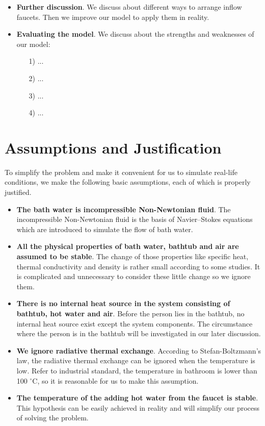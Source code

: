 \documentclass{mcmthesis}
\begin{document}
\begin{itemize}
\item {\bf Further discussion}. We discuss about different ways to arrange inflow 
faucets. Then we improve our model to apply them in reality.

\item {\bf Evaluating the model}. We discuss about the strengths and weaknesses 
of our model:

\begin{itemize}
\item[1)] ... 
\item[2)] ...
\item[3)] ...
\item[4)] ...
\end{itemize}

\end{itemize}

\section{Assumptions and Justification}

To simplify the problem and make it convenient for us to simulate real-life 
conditions, we make the following basic assumptions, each of which is properly 
justified.

\begin{itemize}
\item {\bf The bath water is incompressible Non-Newtonian fluid}. The 
incompressible Non-Newtonian fluid is the basis of Navier–Stokes equations 
which are introduced to simulate the flow of bath water.

\item {\bf All the physical properties of bath water, bathtub and air are 
assumed to be stable}. The change of those properties like specific heat, 
thermal conductivity and density is rather small according to some 
studies. It is complicated and unnecessary to consider these little 
change so we ignore them.

\item {\bf There is no internal heat source in the system consisting of bathtub, 
hot water and air}. Before the person lies in the bathtub, no internal heat source 
exist except the system components. The circumstance where the person is in the 
bathtub will be investigated in our later discussion.

\item {\bf We ignore radiative thermal exchange}. According to Stefan-Boltzmann’s 
law, the radiative thermal exchange can be ignored when the temperature is low. 
Refer to industrial standard, the temperature in bathroom is lower than 
100 $^{\circ}$C, so it is reasonable for us to make this assumption.

\item {\bf The temperature of the adding hot water from the faucet is stable}. 
This hypothesis can be easily achieved in reality and will simplify our process 
of solving the problem.
\end{itemize}
\end{document}
